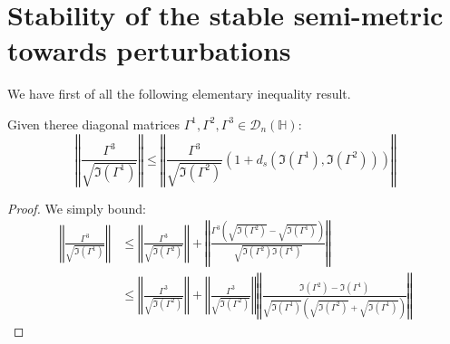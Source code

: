 \documentclass[ECP, preprint]{ejpecp} %
\begin{document}
\section{Stability of the stable semi-metric towards perturbations}
We have first of all the following elementary inequality result.
\begin{lemma}
    Given theree diagonal matrices $\Gamma^1,\Gamma^2,\Gamma^3\in\mathcal{D}_n(\mathbb{H})$:
    $$\left\Vert \frac{\Gamma^3}{\sqrt{\Im(\Gamma^1)}} \right\Vert\leq \left\Vert \frac{\Gamma^3}{\sqrt{\Im(\Gamma^2)}}(1+d_s(\Im(\Gamma^1),\Im(\Gamma^2))) \right\Vert$$
\end{lemma}
\begin{proof}
    We simply bound:
     \begin{equation*}
    \begin{split}
    \left\Vert \frac{\Gamma^3}{\sqrt{\Im(\Gamma^1)}} \right\Vert 
    &\leq  \left\Vert \frac{\Gamma^3}{\sqrt{\Im(\Gamma^2)}} \right\Vert 
+\left\Vert \frac{\Gamma^3 \left(\sqrt{\Im(\Gamma^2)}-\sqrt{\Im(\Gamma^1)}\right)}{\sqrt{\Im(\Gamma^2)\Im(\Gamma^1)}} \right\Vert \\
    &\leq \left\Vert \frac{\Gamma^3}{\sqrt{\Im(\Gamma^2)}} \right\Vert 
+\left\Vert \frac{\Gamma^3}{\sqrt{\Im(\Gamma^2)}} \right\Vert \left\Vert \frac{\Im(\Gamma^2)-\Im(\Gamma^1)}{\sqrt{\Im(\Gamma^1)}\left(\sqrt{\Im(\Gamma^2)}+\sqrt{\Im(\Gamma^1)}\right)} \right\Vert
    \end{split}
    \end{equation*}
\end{proof}
\end{document}
